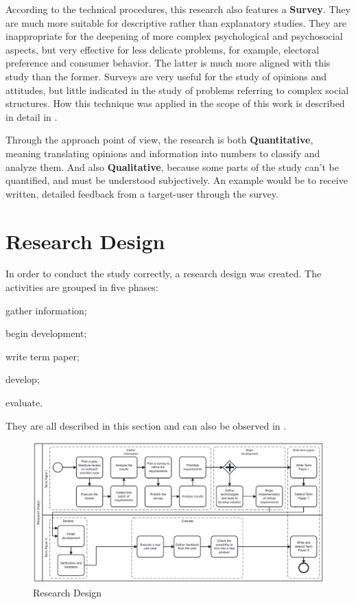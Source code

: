 According to the technical procedures, this research also features a \textbf{Survey}. They are much more suitable for descriptive rather than explanatory studies. They are inappropriate for the deepening of more complex psychological and psychosocial aspects, but very effective for less delicate problems, for example, electoral preference and consumer behavior. The latter is much more aligned with this study than the former. Surveys are very useful for the study of opinions and attitudes, but little indicated in the study of problems referring to complex social structures. How this technique was applied in the scope of this work is described in detail in .

Through the approach point of view, the research is both \textbf{Quantitative}, meaning translating opinions and information into numbers to classify and analyze them. And also \textbf{Qualitative}, because some parts of the study can't be quantified, and must be understood subjectively. An example would be to receive written, detailed feedback from a target-user through the survey.

\section{Research Design}\label{sec:met-3}

In order to conduct the study correctly, a research design was created. The activities are grouped in five phases:
\begin{inparaenum}[(1)]
  \item gather information;
  \item begin development;
  \item write term paper;
  \item develop;
  \item evaluate.
\end{inparaenum}
They are all described in this section and can also be observed in .

\begin{figure}[!htb]
  \caption{Research Design}\label{fig:research-design}
  \begin{center}
    \includegraphics[width=16cm]{img/2-research design.pdf}
  \end{center}
\end{figure}

